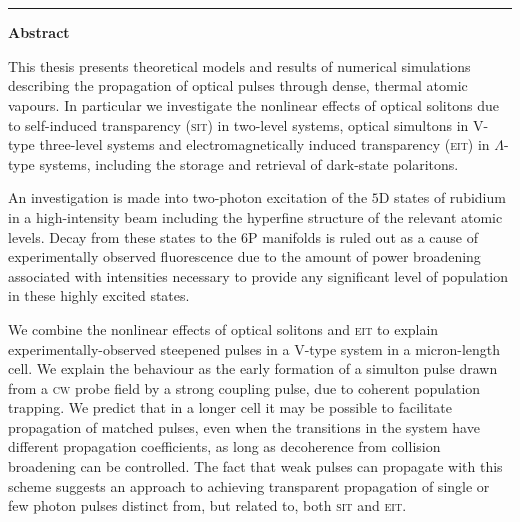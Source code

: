   \thispagestyle{empty}
  \vspace{-1cm}
  \begin{center}
  {\huge \textbf{\thesistitle}}
  \\
  \vspace{0.8cm} {\Large \textbf{\myname}\\\rule{7cm}{0.2mm}}
  \end{center}
  \vspace{0.6cm}
  {\large \textbf{Abstract}}

  \begin{small}
  This thesis presents theoretical models and results of numerical simulations
  describing the propagation of optical pulses through dense, thermal atomic
  vapours. In particular we investigate the nonlinear effects of optical
  solitons due to self-induced transparency (\textsc{sit}) in two-level systems,
  optical simultons in V-type three-level systems and electromagnetically
  induced transparency (\textsc{eit}) in $\Lambda$-type systems, including the
  storage and retrieval of dark-state polaritons.

  An investigation is made into two-photon excitation of the $5$D states of
  rubidium in a high-intensity beam including the hyperfine structure of the
  relevant atomic levels. Decay from these states to the $6$P manifolds is ruled
  out as a cause of experimentally observed fluorescence due to the amount of
  power broadening associated with intensities necessary to provide any
  significant level of population in these highly excited states.

  We combine the nonlinear effects of optical solitons and \textsc{eit} to
  explain experimentally-observed steepened pulses in a V-type system in a
  micron-length cell. We explain the behaviour as the early formation of a
  simulton pulse drawn from a \textsc{cw} probe field by a strong coupling
  pulse, due to coherent population trapping. We predict that in a longer cell
  it may be possible to facilitate propagation of matched pulses, even when the
  transitions in the system have different propagation coefficients, as long as
  decoherence from collision broadening can be controlled. The fact that weak
  pulses can propagate with this scheme suggests an approach to achieving
  transparent propagation of single or few photon pulses distinct from, but
  related to, both \textsc{sit} and \textsc{eit}.

  \end{small}

  \newpage